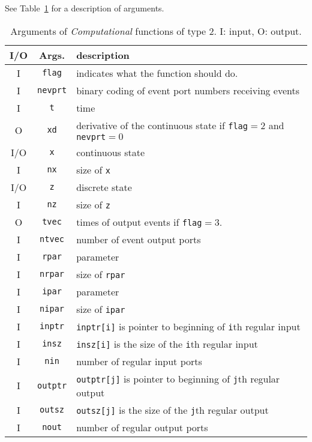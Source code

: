 \documentclass{book}
\newcommand{\computational}{{\em Computational }}
\begin{document}
See Table~\ref{tab20} for a description of arguments.
\begin{table}[ht]
\begin{center}
\begin{tabular}{|c|c|l|} \hline
I/O&Args.&description \\ \hline
I& {\tt  *flag}& indicates what the function should do.\\
I& {\tt  *nevprt}& binary coding of event port numbers
      receiving events\\
I& {\tt  *t}& time\\
O& {\tt  xd}& derivative of the continuous
       state if {\tt flag}$=$2 and {\tt nevprt}$=0$ \\
I/O& {\tt  x}& continuous state\\
I& {\tt  *nx}& size of {\tt x}\\
I/O& {\tt  z}& discrete state\\
I& {\tt  *nz}& size of {\tt z}\\
O& {\tt  tvec} & times of output events if {\tt flag}$=$3.\\
I& {\tt  *ntvec}& number of event output ports\\
I& {\tt  rpar}& parameter\\
I& {\tt  *nrpar}& size of {\tt rpar}\\
I& {\tt  ipar}& parameter\\
I& {\tt  *nipar}& size of {\tt ipar}\\
I& {\tt  inptr}& {\tt inptr[i]} is  pointer to
         beginning of  {\tt i}th regular input\\
I& {\tt  insz}& {\tt insz[i]} is the size of the
        {\tt i}th regular  input \\
I& {\tt  *nin}& number of regular input ports\\
I& {\tt  outptr}& {\tt outptr[j]} is pointer to 
       beginning of {\tt j}th regular output \\
I& {\tt  outsz}& {\tt outsz[j]} is the size of the
          {\tt j}th regular  output \\
I& {\tt  *nout}& number of regular output ports \\ \hline
\end{tabular}
\caption{Arguments of \computational functions of type 2. I: input, O: output.}
\label{tab20}
\end{center}
\end{table}
\end{document}
